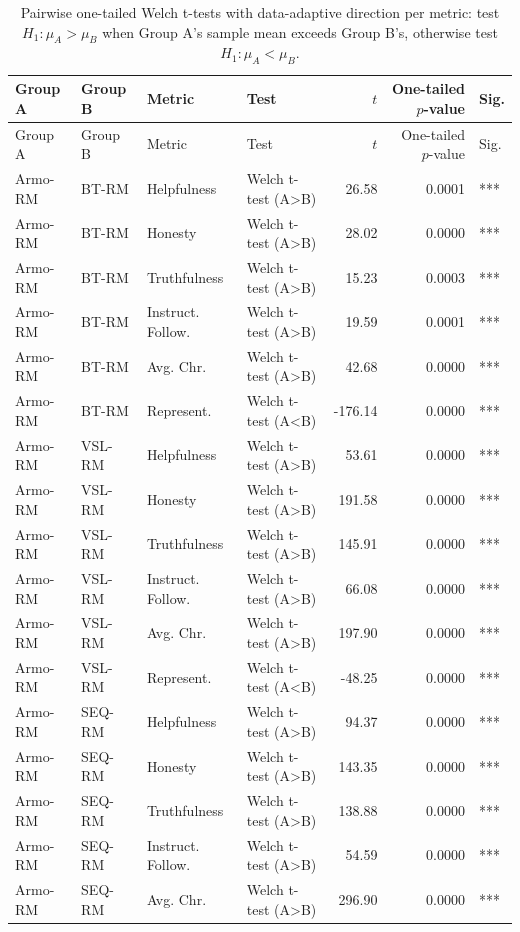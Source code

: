 \documentclass{article}
\begin{document}
\begin{longtable}{llllrrl}
\caption{Pairwise one-tailed Welch t-tests with data-adaptive direction per metric: test $H_1: \mu_{A} > \mu_{B}$ when Group A's sample mean exceeds Group B's, otherwise test $H_1: \mu_{A} < \mu_{B}$.}\label{tab:pairwise-tests}\\
\toprule
Group A & Group B & Metric & Test & $t$ & One-tailed $p$-value & Sig. \\
\midrule
\endfirsthead
\toprule
Group A & Group B & Metric & Test & $t$ & One-tailed $p$-value & Sig. \\
\midrule
\endhead
\bottomrule
\endfoot
Armo-RM & BT-RM & Helpfulness & Welch t-test (A>B) & 26.58 & 0.0001 & *** \\
Armo-RM & BT-RM & Honesty & Welch t-test (A>B) & 28.02 & 0.0000 & *** \\
Armo-RM & BT-RM & Truthfulness & Welch t-test (A>B) & 15.23 & 0.0003 & *** \\
Armo-RM & BT-RM & Instruct. Follow. & Welch t-test (A>B) & 19.59 & 0.0001 & *** \\
Armo-RM & BT-RM & Avg. Chr. & Welch t-test (A>B) & 42.68 & 0.0000 & *** \\
Armo-RM & BT-RM & Represent. & Welch t-test (A<B) & -176.14 & 0.0000 & *** \\
Armo-RM & VSL-RM & Helpfulness & Welch t-test (A>B) & 53.61 & 0.0000 & *** \\
Armo-RM & VSL-RM & Honesty & Welch t-test (A>B) & 191.58 & 0.0000 & *** \\
Armo-RM & VSL-RM & Truthfulness & Welch t-test (A>B) & 145.91 & 0.0000 & *** \\
Armo-RM & VSL-RM & Instruct. Follow. & Welch t-test (A>B) & 66.08 & 0.0000 & *** \\
Armo-RM & VSL-RM & Avg. Chr. & Welch t-test (A>B) & 197.90 & 0.0000 & *** \\
Armo-RM & VSL-RM & Represent. & Welch t-test (A<B) & -48.25 & 0.0000 & *** \\
Armo-RM & SEQ-RM & Helpfulness & Welch t-test (A>B) & 94.37 & 0.0000 & *** \\
Armo-RM & SEQ-RM & Honesty & Welch t-test (A>B) & 143.35 & 0.0000 & *** \\
Armo-RM & SEQ-RM & Truthfulness & Welch t-test (A>B) & 138.88 & 0.0000 & *** \\
Armo-RM & SEQ-RM & Instruct. Follow. & Welch t-test (A>B) & 54.59 & 0.0000 & *** \\
Armo-RM & SEQ-RM & Avg. Chr. & Welch t-test (A>B) & 296.90 & 0.0000 & *** \\

\end{longtable}
\end{document}
